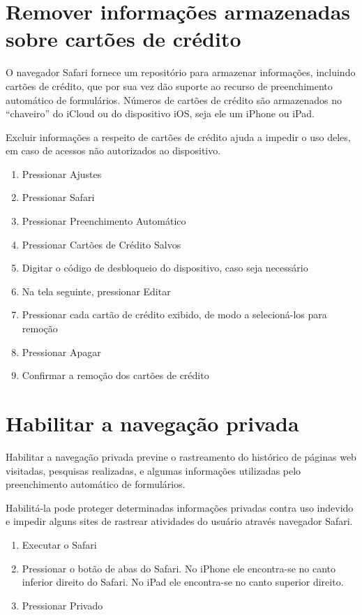 \section{Remover informa\c c\~oes armazenadas sobre cart\~oes de cr\'edito}

O navegador Safari fornece um reposit\'orio para armazenar informa\c c\~oes, incluindo cart\~oes de cr\'edito, que por sua vez d\~ao suporte ao recurso de  preenchimento autom\'atico de formul\'arios. N\'umeros de cart\~oes de cr\'edito s\~ao armazenados no ``chaveiro'' do iCloud ou do dispositivo iOS, seja ele um iPhone ou iPad. 

Excluir informa\c c\~oes a respeito de cart\~oes de cr\'edito ajuda a impedir o uso deles, em caso de acessos n\~ao autorizados ao dispositivo.

\begin{enumerate}
\item Pressionar Ajustes
\item Pressionar Safari
\item Pressionar Preenchimento Autom\'atico
\item Pressionar Cart\~oes de Cr\'edito Salvos
\item Digitar o c\'odigo de desbloqueio do dispositivo, caso seja necess\'ario
\item Na tela seguinte, pressionar Editar
\item Pressionar cada cart\~ao de cr\'edito exibido, de modo a selecion\'a-los para remo\c c\~ao
\item Pressionar Apagar
\item Confirmar a remo\c c\~ao dos cart\~oes de cr\'edito 
\end{enumerate}	

\section{Habilitar a navega\c c\~ao privada}

Habilitar a navega\c c\~ao privada previne o rastreamento do hist\'orico de p\'aginas web visitadas, pesquisas realizadas, e algumas informa\c c\~oes utilizadas pelo preenchimento autom\'atico de formul\'arios.

Habilit\'a-la pode proteger determinadas informa\c c\~oes privadas contra uso indevido e impedir alguns sites de rastrear atividades do usu\'ario atrav\'es navegador Safari.

\begin{enumerate}
\item Executar o Safari
\item Pressionar o bot\~ao de abas do Safari. No iPhone ele encontra-se no canto inferior direito do Safari. No iPad ele encontra-se no canto superior direito. 
\item Pressionar Privado
\end{enumerate}

